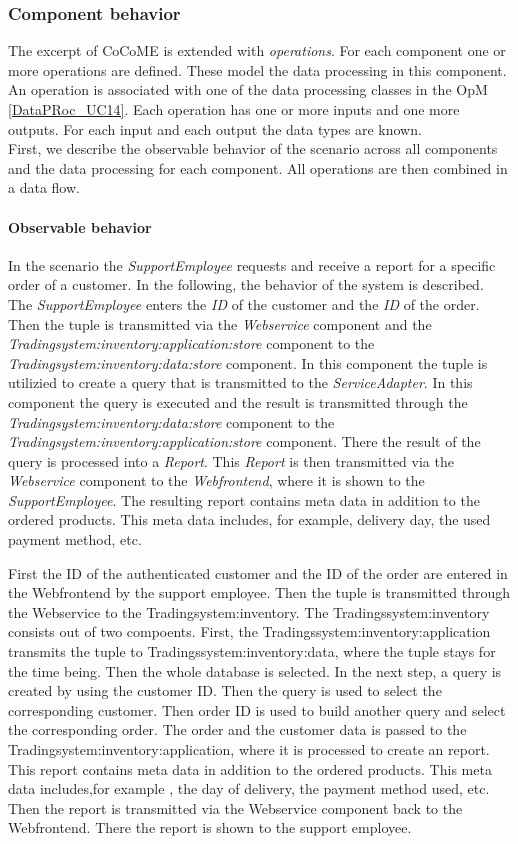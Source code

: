 \subsubsection{Component behavior}
The excerpt of CoCoME  is extended with \textit{operations}. For each component one or more operations are defined. These model the data processing in this component. An operation is associated with one of the data processing classes in the OpM \autoref{DataPRoc_UC14}. Each operation has one or more inputs and one more outputs. For each input and each output the data types are known. \\
First, we describe the observable behavior of the scenario across all components and the data processing for each component. All operations are then combined in a data flow.
\paragraph{Observable behavior}
In the scenario the \textit{SupportEmployee} requests and receive a report for a specific order of a customer. In the following, the behavior of the system  is described.\\
The \textit{SupportEmployee} enters the \textit{ID} of the customer and the \textit{ID} of the order. Then the tuple is transmitted via the \textit{Webservice} component and the \textit{Tradingsystem:inventory:application:store} component to the \textit{Tradingsystem:inventory:data:store} component. In this component the tuple is utilizied to create a query that is transmitted to the \textit{ServiceAdapter}. In this component the query is executed and the result is transmitted through the \textit{Tradingsystem:inventory:data:store} component to the \textit{Tradingsystem:inventory:application:store} component. There the result of the query is processed into a \textit{Report}. This \textit{Report} is then transmitted via the \textit{Webservice} component to the \textit{Webfrontend}, where it is shown to the \textit{SupportEmployee}. The resulting report contains meta data in addition to the ordered products. This meta data includes, for example, delivery day, the used payment method, etc.


First the ID of the authenticated customer and the ID of the order are entered in the Webfrontend by the support employee. Then the tuple is transmitted through the Webservice to the Tradingsystem:inventory. The Tradingssystem:inventory consists out of two compoents. First, the Tradingssystem:inventory:application transmits the tuple to Tradingssystem:inventory:data, where the tuple stays for the time being. Then the whole database is selected. In the next step, a query is created by using the customer ID. Then the query is used to select the corresponding customer. Then order ID is used to build another query and select the corresponding order. The order and the customer data is passed to the Tradingsystem:inventory:application, where it is processed to create an report. This report contains meta data in addition to the ordered products. This meta data includes,for example , the day of delivery, the payment method used, etc. Then the report is transmitted via the Webservice component back to the Webfrontend. There the report is shown to the support employee.
